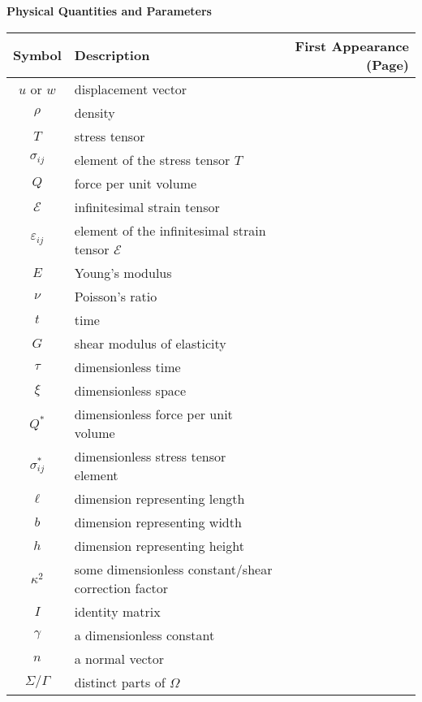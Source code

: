 \documentclass[main.tex]{subfiles}
\begin{document}
\noindent
\textbf{Physical Quantities and Parameters}\\
\begin{tabularx}{\textwidth}{cXr}
\toprule
Symbol & Description & First Appearance (Page) \\ 
\midrule
\( u \) or \( w \) & displacement vector & \pageref{sym:u} \\
\( \rho \) & density & \pageref{sym:rho} \\
\( T \) & stress tensor & \pageref{sym:T} \\
\( \sigma_{ij} \) & element of the stress tensor \( T \) & \pageref{sym:sigmaij} \\
\( Q \) & force per unit volume & \pageref{sym:Q} \\
\( \mathcal{E} \) & infinitesimal strain tensor & \pageref{sym:mathcalE} \\
\( \varepsilon_{ij} \) & element of the infinitesimal strain tensor \( \mathcal{E} \) & \pageref{sym:varepsilonij} \\
\( E \) & Young's modulus & \pageref{sym:E} \\
\( \nu \) & Poisson's ratio & \pageref{sym:nu} \\
\( t \) & time & \pageref{sym:t} \\
\( G \) & shear modulus of elasticity & \pageref{sym:G} \\
\( \tau \) & dimensionless time & \pageref{sym:tau} \\
\( \xi \) & dimensionless space & \pageref{sym:xi} \\
\( Q^* \) & dimensionless force per unit volume & \pageref{sym:Qstar} \\
\( \sigma^*_{ij} \) & dimensionless stress tensor element & \pageref{sym:sigmaijstar} \\
\( \ell \) & dimension representing length & \pageref{sym:ell} \\
\( b \) &  dimension representing width & \pageref{sym:width} \\
\( h \) & dimension representing height & \pageref{sym:height} \\
\( \kappa^2 \) & some dimensionless constant/shear correction factor & \pageref{sym:kappa2} \\
\( I \) & identity matrix & \pageref{sym:I} \\
\( \gamma \) & a dimensionless constant & \pageref{sym:gamma} \\
\( n \) & a normal vector & \pageref{sym:n} \\
\( \Sigma/\Gamma \) & distinct parts of \( \Omega \) & \pageref{sym:SigmaGamma} \\

\end{tabularx}
\end{document}
